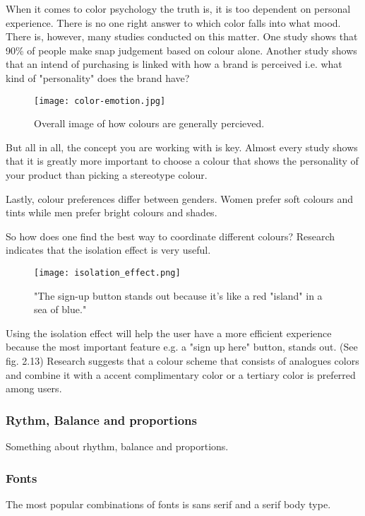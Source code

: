 When it comes to color psychology the truth is, it is too dependent on personal experience. There is no one right answer to which color falls into what mood. \cite{ColorMeaning}
There is, however, many studies conducted on this matter. 
One study shows that 90\% of people make snap judgement based on colour alone. \cite{ColorMeaning} Another study shows that an intend of purchasing is linked with how a brand is perceived i.e. what kind of "personality" does the brand have?\cite{ColorMeaning}

\begin{figure}[H]
\centering
\texttt{[image: color-emotion.jpg]}
\caption{Overall image of how colours are generally percieved. \cite{ColorMeaning}}
\end{figure}

But all in all, the concept you are working with is key. Almost every study shows that it is greatly more important to choose a colour that shows the personality of your product than picking a stereotype colour. \cite{ColorMeaning}

Lastly, colour preferences differ between genders. Women prefer soft colours and tints while men prefer bright colours and shades. \cite{ColorMeaning} 

So how does one find the best way to coordinate different colours? Research indicates that the isolation effect is very useful.

\begin{figure}[H]
\centering
\texttt{[image: isolation\_effect.png]}
\caption{"The sign-up button stands out because it's like a red "island" in a sea of blue." \cite{ColorMeaning}}
\end{figure}

Using the isolation effect will help the user have a more efficient experience because the most important feature e.g. a "sign up here" button, stands out. \cite{ColorMeaning} (See fig. 2.13)
Research suggests that a colour scheme that consists of analogues colors and combine it with a accent complimentary color or a tertiary color is preferred among users. \cite{ColorMeaning}

\subsubsection{Rythm, Balance and proportions}
Something about rhythm, balance and proportions. \cite{DesignPrinciple}

\subsubsection{Fonts}
The most popular combinations of fonts is sans serif and a serif body type. \cite{TypeComb}

